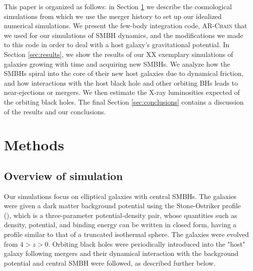 \documentclass[english, apj]{emulateapj}
\begin{document}
This paper is organized as follows: in Section \ref{sec:methods} we describe the cosmological simulations from which we use the merger history to set up our idealized numerical simulations. We present the few-body integration code, \textsc{AR-Chain} that we used for our simulations of SMBH dynamics, and the modifications we made to this code in order to deal with a host galaxy's gravitational potential. In Section \ref{sec:results}, we show the results of our XX exemplary simulations of galaxies growing with time and acquiring new SMBHs. We analyze how the SMBHs spiral into the core of their new host galaxies due to dynamical friction, and how interactions with the host black hole and other orbiting BHs leads to near-ejections or mergers. We then estimate the X-ray luminosities expected of the orbiting black holes.  The final Section \ref{sec:conclusions} contains a discussion of the results and our conclusions.


\section{Methods}\label{sec:methods}

\subsection{Overview of simulation}
Our simulations focus on elliptical galaxies with central SMBHs. The galaxies were given a dark matter background potential using the Stone-Ostriker profile (\citet{2015ApJ...806L..28S}), which is a three-parameter potential-density pair, whose quantities such as density, potential, and binding energy can be written in closed form, having a profile similar to that of a truncated isothermal sphere.  The galaxies were evolved from $4 > z > 0$.  Orbiting black holes were periodically introduced into the "host" galaxy following mergers and their dynamical interaction with the background potential and central SMBH were followed, as described further below.
\end{document}
